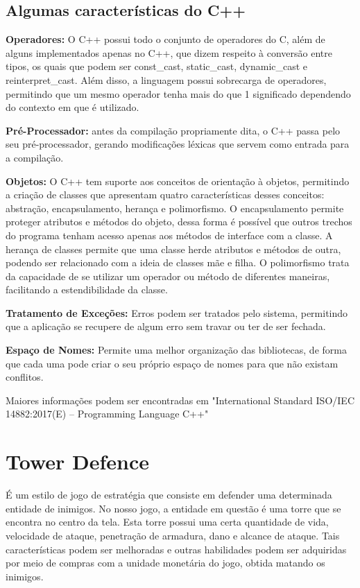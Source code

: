 \documentclass[rel_mlp]{iiufrgs}
\begin{document}
\section{Algumas características do C++}

	\textbf{Operadores:} O C++ possui todo o conjunto de operadores do C, além de alguns implementados apenas no C++, que dizem respeito à conversão entre tipos, os quais que podem ser const\_cast, static\_cast, dynamic\_cast e reinterpret\_cast. Além disso, a linguagem possui sobrecarga de operadores, permitindo que um mesmo operador tenha mais do que 1 significado dependendo do contexto em que é utilizado.

	\textbf{	Pré-Processador:} antes da compilação propriamente dita, o C++ passa pelo seu pré-processador, gerando modificações léxicas que servem como entrada para a compilação.

	\textbf{Objetos:} O C++ tem suporte aos conceitos de orientação à objetos, permitindo a criação de classes que apresentam quatro características desses conceitos: abstração, encapsulamento, herança e polimorfismo. O encapsulamento permite proteger atributos e métodos do objeto, dessa forma  é possível que outros trechos do programa tenham acesso apenas aos métodos de interface com a classe.	A herança de classes permite que uma classe herde atributos e métodos de outra, podendo ser relacionado com a ideia de classes mãe e filha. O polimorfismo trata da capacidade de se utilizar um operador ou método de diferentes maneiras, facilitando a estendibilidade da classe.

	\textbf{	Tratamento de Exceções:} Erros podem ser tratados pelo sistema, permitindo que a aplicação se recupere de algum erro sem travar ou ter de ser fechada.

	\textbf{Espaço de Nomes:} Permite uma melhor organização das bibliotecas, de forma que cada uma pode criar o seu próprio espaço de nomes para que não existam conflitos.

	Maiores informações podem ser encontradas em "International Standard ISO/IEC 14882:2017(E) – Programming Language C++"

\chapter{Tower Defence} \label{Tower Defence}
É um estilo de jogo de estratégia que consiste em defender uma determinada entidade de inimigos. No nosso jogo, a entidade em questão é uma torre que se encontra no centro da tela. Esta torre possui uma certa quantidade de vida, velocidade de ataque, penetração de armadura, dano e alcance de ataque. Tais características podem ser melhoradas e outras habilidades podem ser adquiridas por meio de compras com a unidade monetária do jogo, obtida matando os inimigos.
\end{document}
